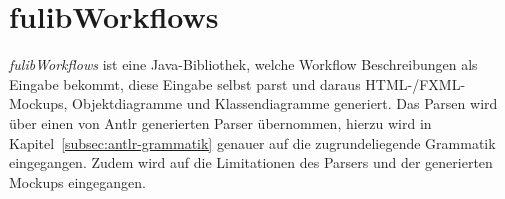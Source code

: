 \section{fulibWorkflows}\label{sec:fulibworkflows2}
\textit{fulibWorkflows} ist eine Java-Bibliothek, welche Workflow Beschreibungen als Eingabe bekommt, diese Eingabe
selbst parst und daraus HTML-/FXML-Mockups, Objektdiagramme und Klassendiagramme generiert.
Das Parsen wird über einen von Antlr generierten Parser übernommen, hierzu wird in Kapitel~\ref{subsec:antlr-grammatik} genauer auf
die zugrundeliegende Grammatik eingegangen.
Zudem wird auf die Limitationen des Parsers und der generierten Mockups eingegangen.








